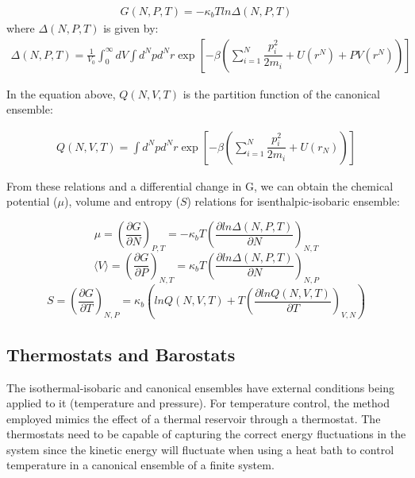 \begin{equation}
\label{eq:fisobari}
\begin{aligned}
G(N,P,T) = -\kappa_{b}T ln \Delta (N,P,T)
\end{aligned}
\end{equation}
where $\Delta (N,P,T)$ is given by: 
\begin{equation}
\begin{aligned}
\Delta (N,P,T) = \frac{1}{V_{0}} \int_{0}^{\infty} dV \int d^{N}p d^{N}r \exp \left[ -\beta \left( \sum_{i=1}^{N}\dfrac{p_{i}^{2}}{2m_{i}} + U(r^{N}) + PV(r^{N}) \right) \right]
\end{aligned}
\end{equation}

In the equation above, $Q (N,V,T)$ is the partition function of the canonical ensemble:

\begin{equation}
\begin{aligned}
Q(N,V,T) = \int d^{N}p d^{N}r \exp \left[ -\beta \left( \sum_{i=1}^{N}\dfrac{p_{i}^{2}}{2m_{i}} + U(r_{N}) \right)
\right]
\end{aligned}
\end{equation}

From these relations and a differential change in G, we can obtain the chemical potential ($\mu$), volume and entropy ($S$) relations for isenthalpic-isobaric ensemble:

\begin{equation}
\mu = (\frac{\partial G}{\partial N})_{P,T} = - \kappa_{b} T (\frac{\partial ln \Delta (N,P,T)}{\partial N})_{N,T}
\end{equation}  
\begin{equation}
\langle V \rangle= (\frac{\partial G}{\partial P})_{N,T}= \kappa_{b} T (\frac{\partial ln \Delta (N,P,T)}{\partial N})_{N,P}
\end{equation}
\begin{equation}
S = (\frac{\partial G}{\partial T})_{N,P}= \kappa_{b}  (ln Q(N,V,T)+ T(\frac{\partial ln Q (N,V,T)}{\partial T})_{V,N})
\end{equation}

\subsection{Thermostats and Barostats}

The isothermal-isobaric and canonical ensembles have external conditions being applied to it (temperature and pressure). For temperature control, the method employed  mimics the effect of a thermal reservoir through a thermostat. The thermostats need to be capable of capturing the correct energy fluctuations in the system since the kinetic energy will fluctuate when using a heat bath to control temperature in a canonical ensemble of a finite system.  

